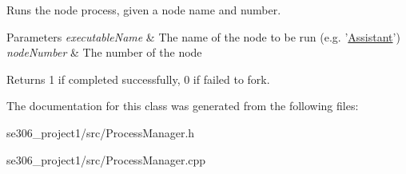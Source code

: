 Runs the node process, given a node name and number. 


\begin{DoxyParams}{Parameters}
{\em executable\-Name} & The name of the node to be run (e.\-g. '\hyperlink{classAssistant}{Assistant}') \\
\hline
{\em node\-Number} & The number of the node \\
\hline
\end{DoxyParams}
\begin{DoxyReturn}{Returns}
1 if completed successfully, 0 if failed to fork. 
\end{DoxyReturn}


The documentation for this class was generated from the following files\-:\begin{DoxyCompactItemize}
\item 
se306\-\_\-project1/src/Process\-Manager.\-h\item 
se306\-\_\-project1/src/Process\-Manager.\-cpp\end{DoxyCompactItemize}
